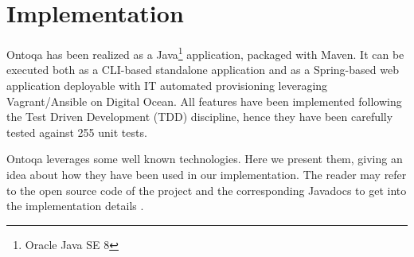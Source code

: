 \section{Implementation}
\label{sec:implementation}

Ontoqa has been realized as a Java\footnote{Oracle Java SE 8} application, packaged with Maven.
%
It can be executed both as a CLI-based standalone application and as a Spring-based web application deployable with IT automated provisioning leveraging Vagrant/Ansible on Digital Ocean.
%
All features have been implemented following the Test Driven Development (TDD) discipline, hence they have been carefully tested against 255 unit tests.

Ontoqa leverages some well known technologies. 
%
Here we present them, giving an idea about how they have been used in our implementation. 
%
The reader may refer to the open source code of the project and the corresponding Javadocs to get into the implementation details \cite{ontoqa}.

